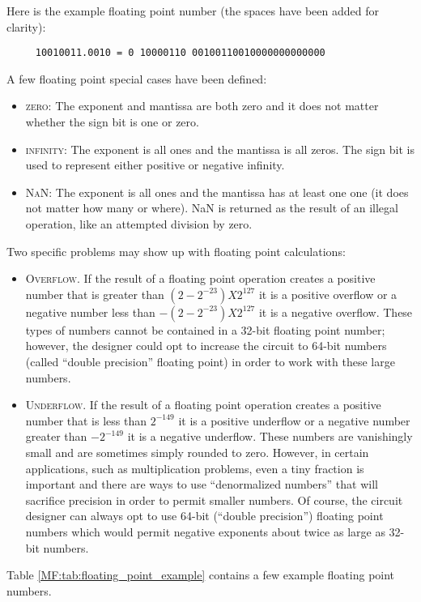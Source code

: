 Here is the example floating point number (the spaces have been added for clarity):

\begin{verbatim}
     10010011.0010 = 0 10000110 00100110010000000000000
\end{verbatim}

A few floating point special cases have been defined:

\begin{itemize}
  \item \textsc{zero}: The exponent and mantissa are both zero and it does not matter whether the sign bit is one or zero. 
  \item \textsc{infinity}: The exponent is all ones and the mantissa is all zeros. The sign bit is used to represent either positive or negative infinity. 
  \item \textsc{\ac{NaN}}: The exponent is all ones and the mantissa has at least one one (it does not matter how many or where). \ac{NaN} is returned as the result of an illegal operation, like an attempted division by zero.
\end{itemize}

Two specific problems may show up with floating point calculations: 

\begin{itemize}
  \item \textsc{Overflow}. If the result of a floating point operation creates a positive number that is greater than $ (2-2^{-23})X 2^{127} $ it is a positive overflow or a negative number less than $ -(2-2^{-23})X 2^{127} $ it is a negative overflow. These types of numbers cannot be contained in a 32-bit floating point number; however, the designer could opt to increase the circuit to 64-bit numbers (called ``double precision'' floating point) in order to work with these large numbers.
  \item \textsc{Underflow}. If the result of a floating point operation creates a positive number that is less than $ 2^{-149} $ it is a positive underflow or a negative number greater than $ -2^{-149} $ it is a negative underflow. These numbers are vanishingly small and are sometimes simply rounded to zero. However, in certain applications, such as multiplication problems, even a tiny fraction is important and there are ways to use ``denormalized numbers'' that will sacrifice precision in order to permit smaller numbers. Of course, the circuit designer can always opt to use 64-bit (``double precision'') floating point numbers which would permit negative exponents about twice as large as 32-bit numbers.

\end{itemize}
Table \ref{MF:tab:floating_point_example} contains a few example floating point numbers.

